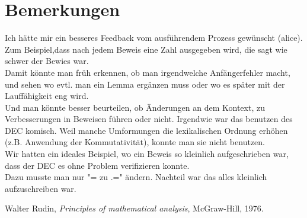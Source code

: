 \documentclass{article}
\begin{document}
\section{Bemerkungen}

Ich h\"atte mir ein besseres Feedback vom ausf\"uhrendem Prozess gew\"unscht (alice).\\
Zum Beispiel,dass nach jedem Beweis eine Zahl ausgegeben wird, die sagt wie schwer der Bewies war.\\
Damit k\"onnte man fr\"uh erkennen, ob man irgendwelche Anfängerfehler macht, und sehen wo evtl. man ein Lemma erg\"anzen muss oder  wo es sp\"ater mit der Lauff\"ahigkeit eng wird.\\
Und man k\"onnte besser beurteilen, ob \"Anderungen an dem Kontext, zu Verbesserungen in Beweisen f\"uhren oder nicht.
Irgendwie war das benutzen des DEC komisch. Weil manche Umformungen die lexikalischen Ordnung erh\"ohen (z.B. Anwendung der  Kommutativit\"at), konnte man sie nicht benutzen.\\
Wir hatten ein ideales Beispiel, wo ein Beweis so kleinlich aufgeschrieben war, dass der DEC es ohne Problem verifizieren konnte.\\
Dazu musste man nur "= zu .=" \"andern. Nachteil war das alles kleinlich aufzuschreiben war.\\



\begin{thebibliography}{1}

  Walter Rudin,
  \textit{Principles of mathematical analysis},
  McGraw-Hill,
  1976.

\end{thebibliography}
  
\end{document}

